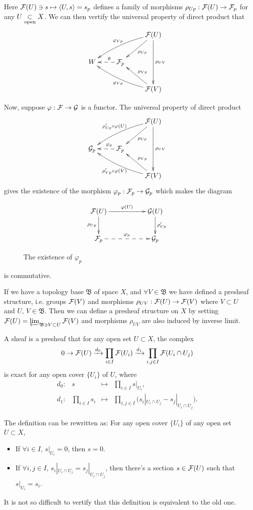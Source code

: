 \documentclass[12pt]{extbook}
\begin{document}
Here $\mathcal{F}(U)\ni s\mapsto \langle U,s\rangle=s_p$ defines a family of morphisms $\rho_{Up}:\mathcal{F}(U)\to \mathcal{F}_p$ for any $U\underset{\mathrm{open}}{\subset} X$. We can then vertify the universal property of direct product that
\[
	\xymatrix{
	&&\ar[dl]^{\rho_{Up}}\calf(U)\ar[dd]^{\rho_{UV}}\ar@/_/[lld]_{\varphi_{Vp}} \\
	W&\ar@{-->}[l]_(0.4){\theta}\calf_p&\\
	&&\ar[ul]_{\rho_{Vp}}\calf(V)\ar@/^/[llu]^{\varphi_{Vp}}
	}
\]

Now, suppose $\varphi:\mathcal{F} \to \mathcal{G}$ is a functor. The universal property of direct product 
\[
	\xymatrix{
		&&\ar[dl]^{\rho_{Up}}\calf(U)\ar[dd]^{\rho_{UV}}\ar@/_/[lld]_{\rho'_{Up}\circ\varphi(U)} \\
		\calg_p&\ar@{-->}[l]_(0.4){\varphi_p}\calf_p&\\
		&&\ar[ul]_{\rho_{Vp}}\calf(V)\ar@/^/[llu]^{\rho'_{Vp}\circ\varphi(V)}
	}
\]
gives the existence of the morphism $\varphi_p:\mathcal{F}_p\to \mathcal{G}_p$ which makes the diagram
\begin{figure}[h]
\[
	\xymatrix{
		\calf(U)\ar[rr]^{\varphi(U)} \ar[d]_{\rho_{Up}}&&\calg(U) \ar[d]^{\rho'_{Up}}\\
		\calf_p\ar@{-->}[rr]^{\varphi_p}&&\calg_p
	}
\]
\caption{The existence of $\varphi_p$}
\label{fig1}
\end{figure}

\noindent is commutative.

\para If we have a topology base $\mathfrak{B}$ of space $X$, and $\forall V\in \mathfrak{B}$ we have defined a presheaf structure, i.e. groups $\mathcal{F}(V)$ and morphisms $\rho_{UV}:\mathcal{F}(U)\to \mathcal{F}(V)$ where $V\subset U$ and $U$, $V\in \mathfrak{B}$. Then we can define a presheaf structure on $X$ by setting $\mathcal{F}(U)=\varprojlim_{\mathfrak{B}\ni V \subset U} \mathcal{F}(V)$ and morphisms $\rho_{UV}$ are also induced by inverse limit.

\para A sheaf is a presheaf that for any open set $U\subset X$, the complex 
\[
	0\rightarrow \mathcal{F}(U) \xrightarrow{d_0}\prod_{i\in I}\mathcal{F}(U_i) \xrightarrow{d_1}\prod_{i,j\in I}\mathcal{F}(U_i\cap U_j)
\]
is exact for any open cover $\{U_i\}$ of $U$, where
\[
\begin{array}{cccl}
	d_0:&s&\mapsto& \displaystyle{\prod_{i\in I}s|_{U_i}},\\
	d_1:&\displaystyle{\prod_{i\in I}s_i}&\mapsto& \displaystyle{\prod_{i,j\in I}\bigl(s_i|_{U_i\cap U_j}-s_j|_{U_i\cap U_j}\bigr)}.
\end{array}
\]

The definition can be rewritten as: For any open cover $\{U_i\}$ of any open set $U\subset X$,
\begin{itemize}
\item If $\forall i\in I$, $s|_{U_i}=0$, then $s=0$.

\item If $\forall i,j\in I$, $s_i|_{U_i\cap U_j}=s_j|_{U_i\cap U_j}$, then there's a section $s\in\mathcal{F}(U)$ such that $s|_{U_i}=s_i$.
\end{itemize}
It is not so difficult to vertify that this definition is equivalent to the old one.
\end{document}
